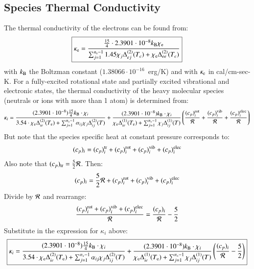 \documentclass{warpdoc}
\newcommand\frameeqn[1]{\fbox{$\displaystyle #1$}}
\begin{document}
\subsection{Species Thermal Conductivity}

The thermal conductivity of the electrons can be found from:
%
\begin{equation}
\frameeqn{
\kappa_{\rm e}=\frac{\frac{15}{4} \cdot 2.3901 \cdot 10^{-8} k_{\rm B} \chi_{\rm e}}{\sum_{j=1}^{n_{\rm s}-1}1.45 \chi_j \Delta_{ej}^{(2)}(T_e) +\chi_{\rm e} \Delta_{ee}^{(2)}(T_e)  }
}
\end{equation}
%
with $k_{\rm B}$ the Boltzman constant ($1.38066\cdot10^{-16}$~erg/K) and with $\kappa_{\rm e}$ in cal/cm-sec-K.
For a fully-excited  rotational state and partially excited vibrational and electronic states, the thermal conductivity of the heavy molecular species (neutrals or ions with more than 1 atom) is determined from:
%
\begin{equation}
\kappa_i = 
\frac{(2.3901\cdot10^{-8}) \frac{15}{4} k_{\rm B}  \cdot \chi_i}{3.54\cdot \chi_{\rm e} \Delta_{ie}^{(2)}(T_{\rm e})+ \sum_{j=1}^{n_s-1} \alpha_{ij} \chi_j \Delta_{ij}^{(2)}(T) }
+
\frac{(2.3901\cdot10^{-8}) k_{\rm B}  \cdot \chi_i}{ \chi_{\rm e} \Delta_{ie}^{(1)}(T_{\rm e})+\sum_{j=1}^{n_s-1} \chi_j \Delta_{ij}^{(1)}(T) }
\left(
\frac{(c_p)_{i}^{{\rm rot}}}{\cal R}+ \frac{(c_p)_{i}^{{\rm vib}}}{\cal R}
+ \frac{(c_p)_{i}^{{\rm elec}}}{\cal R}
\right)
\end{equation}
%
But note that the species specific heat at constant pressure corresponds to:
%
\begin{equation}
    (c_p)_i=(c_p)_i^{{\rm tr}}+(c_p)_i^{{\rm rot}}+(c_p)_i^{{\rm vib}}+(c_p)_{i}^{{\rm elec}}
\end{equation}
%
Also note that $(c_p)_{\rm tr}=\frac{5}{2}{\cal R}$. Then:
%
\begin{equation}
    (c_p)_i=\frac{5}{2}{\cal R}+(c_p)_i^{\rm rot}+(c_p)_i^{\rm vib}+(c_p)_i^{\rm elec}
\end{equation}
%
Divide by $\cal R$ and rearrange:
%
\begin{equation}
    \frac{(c_p)_i^{\rm rot}+(c_p)_i^{\rm vib}+(c_p)_i^{\rm elec}}{\cal R}=\frac{(c_p)_i}{\cal R}-\frac{5}{2}
\end{equation}
%
Substitute in the expression for $\kappa_i$ above:
%
\begin{equation}
\frameeqn{
\kappa_i = 
\frac{(2.3901\cdot10^{-8}) \frac{15}{4} k_{\rm B}  \cdot \chi_i}{3.54\cdot \chi_{\rm e} \Delta_{ie}^{(2)}(T_{\rm e})+ \sum_{j=1}^{n_s-1} \alpha_{ij} \chi_j \Delta_{ij}^{(2)}(T) }
+
\frac{(2.3901\cdot10^{-8}) k_{\rm B}  \cdot \chi_i}{ \chi_{\rm e} \Delta_{ie}^{(1)}(T_{\rm e})+\sum_{j=1}^{n_s-1} \chi_j \Delta_{ij}^{(1)}(T) }
\left(
\frac{(c_p)_i}{\cal R}-\frac{5}{2}
\right)
}
\end{equation}
%
\end{document}
